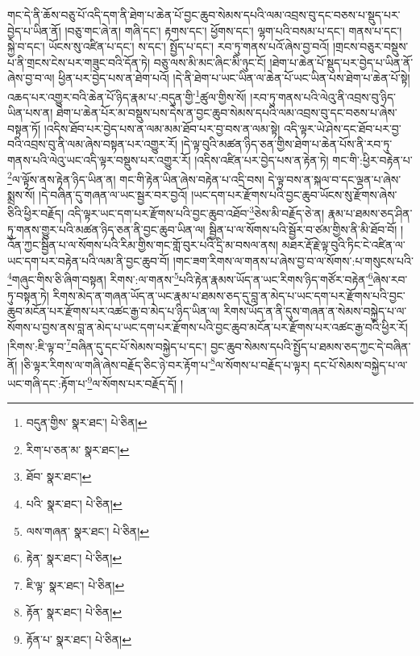གང་དེ་ནི་ཆོས་བཅུ་པོ་འདི་དག་ནི་ཐེག་པ་ཆེན་པོ་བྱང་ཆུབ་སེམས་དཔའི་ལམ་འབྲས་བུ་དང་བཅས་པ་སྡུད་པར་བྱེད་པ་ཡིན་ནོ། །བཅུ་གང་ཞེ་ན། གཞི་དང་། རྟགས་དང་། ཕྱོགས་དང་། ལྷག་པའི་བསམ་པ་དང་། གནས་པ་དང་། སྐྱེ་བ་དང་། ཡོངས་སུ་འཛིན་པ་དང་། ས་དང་། སྤྱོད་པ་དང་། རབ་ཏུ་གནས་པའོ་ཞེས་བྱ་བའོ། །གྲངས་བཅུར་བསྡུས་པ་ནི་གྲངས་ངེས་པར་གཟུང་བའི་དོན་ཏེ། བཅུ་ལས་མི་མང་ཞིང་མི་ཉུང་ངོ། །ཐེག་པ་ཆེན་པོ་སྡུད་པར་བྱེད་པ་ཡིན་ནོ་ཞེས་བྱ་བ་ལ། ཕྱིན་པར་བྱེད་པས་ན་ཐེག་པའོ། །དེ་ནི་ཐེག་པ་ཡང་ཡིན་ལ་ཆེན་པོ་ཡང་ཡིན་པས་ཐེག་པ་ཆེན་པོ་སྟེ། འཆད་པར་འགྱུར་བའི་ཆེན་པོ་ཉིད་རྣམ་པ་:བདུན་གྱི་\footnote{བདུན་གྱིས་  སྣར་ཐང་།  པེ་ཅིན། }ཚུལ་གྱིས་སོ། །རབ་ཏུ་གནས་པའི་ལེའུ་ནི་འབྲས་བུ་ཉིད་ཡིན་པས་ན། ཐེག་པ་ཆེན་པོར་མ་བསྡུས་པས་དེས་ན་བྱང་ཆུབ་སེམས་དཔའི་ལམ་འབྲས་བུ་དང་བཅས་པ་ཞེས་བསྟན་ཏོ། །འདིས་ཐོབ་པར་བྱེད་པས་ན་ལམ་མམ་ཐོབ་པར་བྱ་བས་ན་ལམ་སྟེ། འདི་ལྟར་ཡེ་ཤེས་དང་ཐོབ་པར་བྱ་བའི་འབྲས་བུ་ནི་ལམ་ཞེས་བསྟན་པར་འགྱུར་རོ། །དེ་ལྟ་བུའི་མཚན་ཉིད་ཅན་གྱིས་ཐེག་པ་ཆེན་པོས་ནི་རབ་ཏུ་གནས་པའི་ལེའུ་ཡང་འདི་ལྟར་བསྡུས་པར་འགྱུར་རོ། །འདིས་འཛིན་པར་བྱེད་པས་ན་རྟེན་ཏེ། གང་གི་:ཕྱིར་བརྟེན་པ་\footnote{རིག་པ་ཅན་མ་  སྣར་ཐང་། }ལ་ལྟོས་ནས་རྟེན་ཉིད་ཡིན་ན། གང་གི་རྟེན་ཡིན་ཞེས་བརྟེན་པ་འདྲི་བས། དེ་ལྟ་བས་ན་སྐལ་བ་དང་ལྡན་པ་ཞེས་སྨྲས་སོ། །དེ་བཞིན་དུ་གཞན་ལ་ཡང་སྦྱར་བར་བྱའོ། །ཡང་དག་པར་རྫོགས་པའི་བྱང་ཆུབ་ཡོངས་སུ་རྫོགས་ཞེས་ཅིའི་ཕྱིར་བརྗོད། འདི་ལྟར་ཡང་དག་པར་རྫོགས་པའི་བྱང་ཆུབ་འཐོབ་\footnote{ཐོབ་  སྣར་ཐང་། }ཅེས་མི་བརྗོད་ཅེ་ན། རྣམ་པ་ཐམས་ཅད་ཤིན་ཏུ་གནས་གྱུར་པའི་མཚན་ཉིད་ཅན་ནི་བྱང་ཆུབ་ཡིན་ལ། སྦྱིན་པ་ལ་སོགས་པའི་སྦྱོར་བ་ཙམ་གྱིས་ནི་མི་ཐོབ་བོ། །འོན་ཀྱང་སྦྱིན་པ་ལ་སོགས་པའི་རིམ་གྱིས་གང་གློ་བུར་པའི་དྲི་མ་བསལ་ནས། མཐར་རྡོ་རྗེ་ལྟ་བུའི་ཏིང་ངེ་འཛིན་ལ་ཡང་དག་པར་བརྟེན་པའི་ལམ་ནི་བྱང་ཆུབ་བོ། །གང་ཟག་རིགས་ལ་གནས་པ་ཞེས་བྱ་བ་ལ་སོགས་:པ་གསུངས་པའི་\footnote{པའི་  སྣར་ཐང་།  པེ་ཅིན། }གཞུང་གིས་ཅི་ཞིག་བསྟན། རིགས་:ལ་གནས་\footnote{ལས་གཞན་  སྣར་ཐང་།  པེ་ཅིན། }པའི་རྟེན་རྣམས་ཡོད་ན་ཡང་རིགས་ཉིད་གཙོར་བརྟེན་\footnote{རྟེན་  སྣར་ཐང་།  པེ་ཅིན། }ཞེས་རབ་ཏུ་བསྟན་ཏེ། རིགས་མེད་ན་གཞན་ཡོད་ན་ཡང་རྣམ་པ་ཐམས་ཅད་དུ་བླ་ན་མེད་པ་ཡང་དག་པར་རྫོགས་པའི་བྱང་ཆུབ་མངོན་པར་རྫོགས་པར་འཚང་རྒྱ་བ་མེད་པ་ཉིད་ཡིན་ལ། རིགས་ཡོད་ན་ནི་དུས་གཞན་ན་སེམས་བསྐྱེད་པ་ལ་སོགས་པ་བྱས་ནས་བླ་ན་མེད་པ་ཡང་དག་པར་རྫོགས་པའི་བྱང་ཆུབ་མངོན་པར་རྫོགས་པར་འཚང་རྒྱ་བའི་ཕྱིར་རོ། །རིགས་:ཇི་ལྟ་བ་\footnote{ཇི་ལྟ་  སྣར་ཐང་།  པེ་ཅིན། }བཞིན་དུ་དང་པོ་སེམས་བསྐྱེད་པ་དང་། བྱང་ཆུབ་སེམས་དཔའི་སྤྱོད་པ་ཐམས་ཅད་ཀྱང་དེ་བཞིན་ནོ། །ཅི་ལྟར་རིགས་ལ་གཞི་ཞེས་བརྗོད་ཅིང་ཉེ་བར་རྟོག་པ་\footnote{རྟོན་  སྣར་ཐང་།  པེ་ཅིན། }ལ་སོགས་པ་བརྗོད་པ་ལྟར། དང་པོ་སེམས་བསྐྱེད་པ་ལ་ཡང་གཞི་དང་:རྟོག་པ་\footnote{རྟོན་པ་  སྣར་ཐང་།  པེ་ཅིན། }ལ་སོགས་པར་བརྗོད་དོ། །
